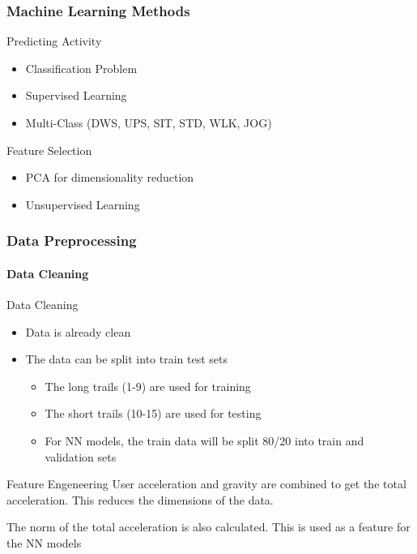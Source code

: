 \documentclass[
	11pt, %
]{beamer}
\begin{document}
\begin{frame}
    \frametitle{Machine Learning Methods}

    \begin{block}{Predicting Activity}
        \begin{itemize}
            \item Classification Problem
            \item Supervised Learning
            \item Multi-Class (DWS, UPS, SIT, STD, WLK, JOG)
        \end{itemize}
    \end{block}

    \bigskip

    \begin{block}{Feature Selection}
        \begin{itemize}
            \item PCA for dimensionality reduction
            \item Unsupervised Learning
        \end{itemize}
    \end{block}
\end{frame}

\begin{frame}
    \frametitle{Data Preprocessing}
    \framesubtitle{Data Cleaning}

    \begin{block}{Data Cleaning}
        \begin{itemize}
            \item Data is already clean
            \item The data can be split into train test sets
            \begin{itemize}
                \item The long trails (1-9) are used for training
                \item The short trails (10-15) are used for testing
                \item For NN models, the train data will be split 80/20 into train and validation sets 
            \end{itemize}
        \end{itemize}
    \end{block}

    \begin{block}{Feature Engeneering}
        User acceleration and gravity are combined to get the total acceleration. This reduces the dimensions of the data.

        The norm of the total acceleration is also calculated. This is used as a feature for the NN models
    \end{block}
\end{frame}
\end{document}
